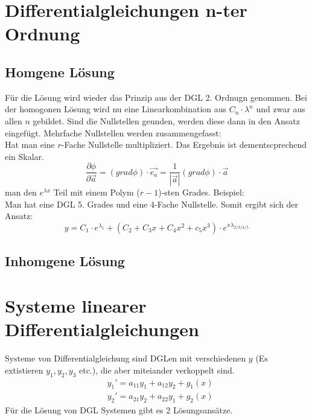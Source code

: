 \documentclass[a4paper,10pt]{scrartcl}
\begin{document}
        \section{Differentialgleichungen n-ter Ordnung}
        \subsection*{Homgene Lösung}
        Für die Lösung wird wieder das Prinzip aus der DGL 2. Ordnugn genommen. Bei der homogonen Lösung wird nu eine Linearkombination aus \(C_n \cdot \lambda^n \) und 
        zwar aus allen \(n\) gebildet. Sind die Nullstellen geunden, werden diese dann in den Ansatz eingefügt. Mehrfache Nullstellen werden zusammengefasst: \\
        Hat man eine \(r\)-Fache Nullstelle multipliziert. Das Ergebnis ist dementscprechend ein Skalar. 
        \begin{equation*}
            \frac{\partial \phi}{\partial \vec{a}} = (grad \phi) \cdot \vec{e_a} = \frac{1}{|\vec{a}|} (grad \phi) \cdot \vec{a}
        \end{equation*} man den \(e^{\lambda x}\) Teil mit einem Polym (\(r-1\))-sten Grades. Beispiel: \\
        Man hat eine DGL 5. Grades und eine 4-Fache Nullstelle. Somit ergibt sich der Ansatz: 
        \begin{equation}
            y = C_1 \cdot e^{\lambda_1} + (C_2 + C_3x + C_4x^2 + c_5x^3) \cdot e^{x \lambda_{2/3/4/5}}
        \end{equation}   

        \subsection*{Inhomgene Lösung}

        \section{Systeme linearer Differentialgleichungen}
        Systeme von Differentialgleichung sind DGLen mit verschiedenen \(y\) (Es extistieren  \(y_1, y_2, y_3\) etc.), die aber miteiander verkoppelt sind.
        \begin{equation*}
            \begin{aligned}
                & y_1' = a_{11}y_1 + a_{12}y_2 + g_1(x) \\
                & y_2' = a_{21}y_2 + a_{22}y_1 + g_2(x)  
            \end{aligned}
        \end{equation*}
        Für die Lösung von DGL Systemen gibt es 2 Lösungsansätze.
\end{document}
